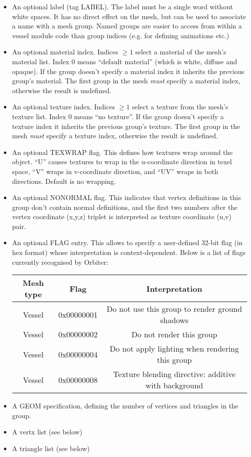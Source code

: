 \documentclass[Orbiter Developer Manual.tex]{subfiles}
\begin{document}
\begin{itemize}
\item An optional label (tag LABEL). The label must be a single word without white spaces. It has no direct effect on the mesh, but can be used to associate a name with a mesh group. Named groups are easier to access from within a vessel module code than group indices (e.g. for defining animations etc.)
\item An optional material index. Indices $\geq 1$ select a material of the mesh’s material list. Index 0 means “default material” (which is white, diffuse and opaque). If the group doesn’t specify a material index it inherits the previous group’s material. The first group in the mesh \textit{must} specify a material index, otherwise the result is undefined.
\item An optional texture index. Indices $\geq 1$ select a texture from the mesh’s texture list. Index 0 means “no texture”. If the group doesn’t specify a texture index it inherits the previous group’s texture. The first group in the mesh \textit{must} specify a texture index, otherwise the result is undefined.
\item An optional TEXWRAP flag. This defines how textures wrap around the object. “U” causes textures to wrap in the u-coordinate direction in texel space, “V” wraps in v-coordinate direction, and “UV” wraps in both directions. Default is no wrapping.
\item An optional NONORMAL flag. This indicates that vertex definitions in this group don’t contain normal definitions, and the first two numbers after the vertex coordinate (x,y,z) triplet is interpreted as texture coordinate (u,v) pair.
\item An optional FLAG entry. This allows to specify a user-defined 32-bit flag (in hex format) whose interpretation is context-dependent. Below is a list of flags currently recognised by Orbiter:

\begin{table}[H]
	\centering
	\begin{tabular}{ |c|c|c| }
	\hline\rule{0pt}{2ex}
	\textbf{Mesh type} & \textbf{Flag} & \textbf{Interpretation} \\
	\hline\rule{0pt}{2ex}
	Vessel & 0x00000001 & Do not use this group to render ground shadows\\
	\hline\rule{0pt}{2ex}
	Vessel & 0x00000002 & Do not render this group\\
	\hline\rule{0pt}{2ex}
	Vessel & 0x00000004 & Do not apply lighting when rendering this group\\
	\hline\rule{0pt}{2ex}
	Vessel & 0x00000008 & Texture blending directive: additive with background\\
	\hline
	\end{tabular}
\end{table}

\item A GEOM specification, defining the number of vertices and triangles in the group.
\item A vertx list (see below)
\item A triangle list (see below)
\end{itemize}
\end{document}
